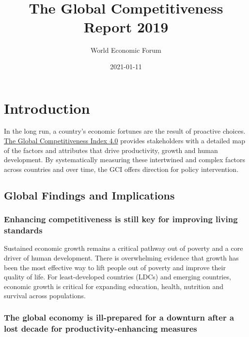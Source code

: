 \documentclass[
]{article}
\title{The Global Competitiveness Report 2019}
\author{World Economic Forum}
\date{2021-01-11}
\begin{document}
\maketitle

{
\setcounter{tocdepth}{2}
\tableofcontents
}
\hypertarget{introduction}{%
\section{Introduction}\label{introduction}}

In the long run, a country's economic fortunes are the result of
proactive choices.
\href{https://www3.weforum.org/docs/WEF_TheGlobalCompetitivenessReport2019.pdf}{The
Global Competitiveness Index 4.0} provides stakeholders with a detailed
map of the factors and attributes that drive productivity, growth and
human development. By systematically measuring these intertwined and
complex factors across countries and over time, the GCI offers direction
for policy intervention.

\hypertarget{global-findings-and-implications}{%
\subsection{Global Findings and
Implications}\label{global-findings-and-implications}}

\hypertarget{enhancing-competitiveness-is-still-key-for-improving-living-standards}{%
\subsubsection{Enhancing competitiveness is still key for improving
living
standards}\label{enhancing-competitiveness-is-still-key-for-improving-living-standards}}

Sustained economic growth remains a critical pathway out of poverty and
a core driver of human development. There is overwhelming evidence that
growth has been the most effective way to lift people out of poverty and
improve their quality of life. For least-developed countries (LDCs) and
emerging countries, economic growth is critical for expanding education,
health, nutrition and survival across populations.

\hypertarget{the-global-economy-is-ill-prepared-for-a-downturn-after-a-lost-decade-for-productivity-enhancing-measures}{%
\subsubsection{The global economy is ill-prepared for a downturn after a
lost decade for productivity-enhancing
measures}\label{the-global-economy-is-ill-prepared-for-a-downturn-after-a-lost-decade-for-productivity-enhancing-measures}}
\end{document}
